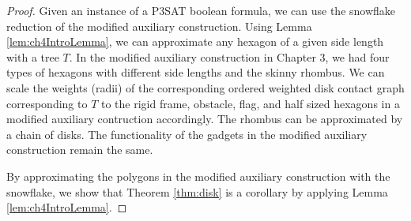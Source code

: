 \begin{proof}
Given an instance of a P3SAT boolean formula, we can use the snowflake reduction of the modified auxiliary construction.  
Using Lemma \ref{lem:ch4IntroLemma}, we can approximate any hexagon of a given side length with a tree $T$.  
In the modified auxiliary construction in Chapter 3, we had four types of hexagons with different side lengths and the skinny rhombus.  
We can scale the weights (radii) of the corresponding ordered weighted disk contact graph corresponding to $T$ to the rigid frame, obstacle, flag, and half sized hexagons in a modified auxiliary contruction accordingly.  
The rhombus can be approximated by a chain of disks.  
The functionality of the gadgets in the modified auxiliary construction remain the same.

By approximating the polygons in the modified auxiliary construction with the snowflake, we show that Theorem \ref{thm:disk} is a corollary by applying Lemma \ref{lem:ch4IntroLemma}.  
\end{proof}
